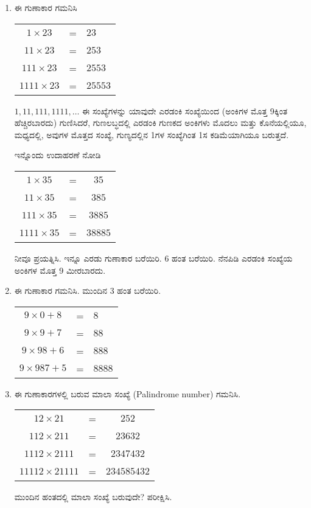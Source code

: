 \begin{enumerate}
\item ಈ ಗುಣಾಕಾರ ಗಮನಿಸಿ 

\begin{tabular}[t]{ccl}
$1\times 23$ & = & $23$\\
$11\times 23$ & = & $253$\\
$111\times 23$ & = & $2553$\\
$1111\times 23$ & = & $25553$
\end{tabular}

$1, 11, 111, 1111, \ldots$ ಈ ಸಂಖ್ಯೆಗಳನ್ನು ಯಾವುದೇ ಎರಡಂಕಿ ಸಂಖ್ಯೆಯಿಂದ (ಅಂಕಿಗಳ ಮೊತ್ತ 9ಕ್ಕಿಂತ ಹೆಚ್ಚಿರಬಾರದು) ಗುಣಿಸಿದರೆ, ಗುಣಲಬ್ಧದಲ್ಲಿ ಎರಡಂಕಿ ಗುಣಕದ ಅಂಕಿಗಳು ಮೊದಲು ಮತ್ತು ಕೊನೆಯಲ್ಲಿಯೂ, ಮಧ್ಯದಲ್ಲಿ, ಅವುಗಳ ಮೊತ್ತದ ಸಂಖ್ಯೆ, ಗುಣ್ಯದಲ್ಲಿನ 1ಗಳ ಸಂಖ್ಯೆಗಿಂತ 1ಸ ಕಡಿಮೆಯಾಗಿಯೂ ಬರುತ್ತದೆ. 

ಇನ್ನೊಂದು ಉದಾಹರಣೆ ನೋಡಿ 

\begin{tabular}[t]{ccc}
$1\times 35$ & = & $35$\\
$11\times 35$ & = & $385$\\
$111\times 35$ & = & $3885$\\
$1111\times 35$ & = & $38885$
\end{tabular}

ನೀವೂ ಪ್ರಯತ್ನಿಸಿ. ಇನ್ನೂ ಎರಡು ಗುಣಾಕಾರ ಬರೆಯಿರಿ. 6 ಹಂತ ಬರೆಯಿರಿ. ನೆನಪಿಡಿ ಎರಡಂಕಿ ಸಂಖ್ಯೆಯ ಅಂಕಿಗಳ ಮೊತ್ತ  9 ಮೀರಬಾರದು. 

\item ಈ ಗುಣಾಕಾರ ಗಮನಿಸಿ. ಮುಂದಿನ 3 ಹಂತ ಬರೆಯಿರಿ. 

\begin{tabular}[t]{ccl}
$9\times 0 + 8$ & = & $8$\\
$9\times 9 + 7$ & = & $88$\\
$9\times 98 + 6$ & = & $888$\\
$9\times 987 + 5$ & = & $8888$\\
\end{tabular}

\item ಈ ಗುಣಾಕಾರಗಳಲ್ಲಿ ಬರುವ ಮಾಲಾ ಸಂಖ್ಯೆ (Palindrome number) ಗಮನಿಸಿ. 

\begin{tabular}[t]{ccc}
$12\times 21$ & = & $252$\\
$112\times 211$ & = & $23632$\\
$1112\times 2111$ & = & $2347432$\\
$11112\times 21111$ & = & $234585432$\\
\end{tabular}

ಮುಂದಿನ ಹಂತದಲ್ಲಿ ಮಾಲಾ ಸಂಖ್ಯೆ ಬರುವುದೇ? ಪರೀಕ್ಷಿಸಿ. 


\end{enumerate}
